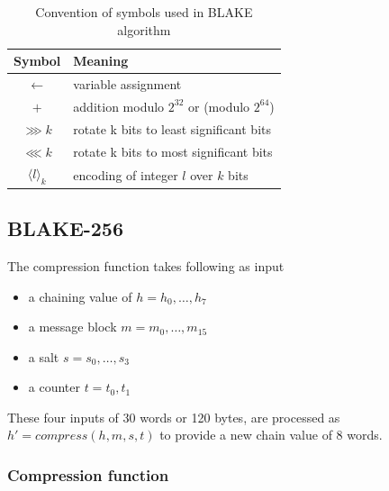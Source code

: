 \begin{table}[h]
  \begin{center}
    \begin{tabular}{ c l } \hline
      Symbol                  & Meaning \\ \hline
      $\gets$                 & variable assignment \\
      $+$                     & addition modulo $2^{32}$ or (modulo $2^{64}$) \\
      $\ggg k$                & rotate k bits to least significant bits \\
      $\lll k$                 & rotate k bits to most significant bits \\
      $\langle l \rangle_{k}$ & encoding of integer $l$ over $k$ bits \\ \hline
    \end{tabular}
    \caption{Convention of symbols used in BLAKE algorithm \cite{00002}}
  \end{center}
\end{table}

\newpage

\subsection{ BLAKE-256 }

The compression function takes following as input
\begin{itemize}
  \item a chaining value of $h = h_{0},\dots, h_{7}$
  \item a message block $m = m_{0},\dots, m_{15}$
  \item a salt $s = s_{0},\dots, s_{3}$
  \item a counter $t = t_{0}, t_{1}$
\end{itemize}
These four inputs of 30 words or 120 bytes, are processed as $h' = compress(h, m, s, t)$ to provide a new
chain value of 8 words.

  \subsubsection{Compression function}

